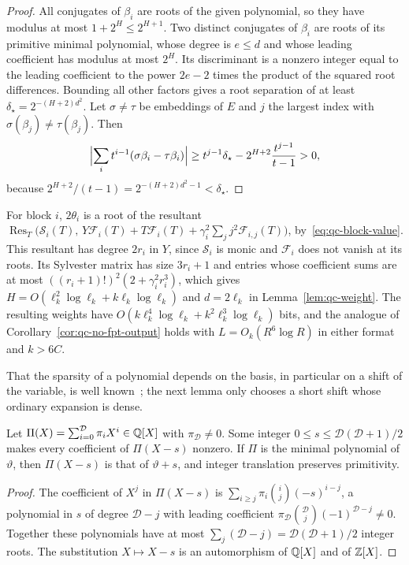 \begin{proof}
All conjugates of $\beta_i$ are roots of the given polynomial, so they have
modulus at most $1+2^H\le2^{H+1}$. Two distinct conjugates of $\beta_i$ are
roots of its primitive minimal polynomial, whose degree is $e\le d$ and whose
leading coefficient has modulus at most $2^H$. Its discriminant is a nonzero
integer equal to the leading coefficient to the power $2e-2$ times the
product of the squared root differences. Bounding all other factors gives a
root separation of at least $\delta_\star=2^{-(H+2)d^2}$. Let $\sigma\ne\tau$
be embeddings of $E$ and $j$ the largest index with
$\sigma(\beta_j)\ne\tau(\beta_j)$. Then
\[
\Bigl\lvert\sum_it^{i-1}(\sigma\beta_i-\tau\beta_i)\Bigr\rvert
\ge t^{j-1}\delta_\star-2^{H+2}\frac{t^{j-1}}{t-1}>0,
\]
because $2^{H+2}/(t-1)=2^{-(H+2)d^2-1}<\delta_\star$.
\end{proof}

For block $i$, $2\theta_i$ is a root of the resultant
$\operatorname{Res}_T\bigl(\mathcal S_i(T),\,Y\mathcal F_i(T)+T\mathcal F_i(T)
+\gamma_i^2\sum_jj^2\mathcal F_{i,j}(T)\bigr)$, by~\eqref{eq:qc-block-value}.
This resultant has degree $2r_i$ in $Y$, since $\mathcal S_i$ is monic and
$\mathcal F_i$ does not vanish at its roots. Its Sylvester matrix has size
$3r_i+1$ and entries whose coefficient sums are at most
$((r_i+1)!)^2(2+\gamma_i^2r_i^3)$, which gives
$H=O(\ell_k^2\log\ell_k+k\ell_k\log\ell_k)$ and $d=2\ell_k$ in
Lemma~\ref{lem:qc-weight}. The resulting weights have
$O(k\ell_k^4\log\ell_k+k^2\ell_k^3\log\ell_k)$ bits, and the analogue of
Corollary~\ref{cor:qc-no-fpt-output} holds with $L=O_k(R^6\log R)$ in either
format and $k>6C$.

That the sparsity of a polynomial depends on the basis, in particular on a
shift of the variable, is well known~\cite{GiesbrechtRoche2010}; the next
lemma only chooses a short shift whose ordinary expansion is dense.

\begin{lemma}
\label{lem:qc-translate}
Let $\Pi(X)=\sum_{i=0}^{\mathcal D}\pi_iX^i\in\mathbb Q[X]$ with
$\pi_{\mathcal D}\ne0$. Some integer $0\le s\le\mathcal D(\mathcal D+1)/2$
makes every coefficient of $\Pi(X-s)$ nonzero. If $\Pi$ is the minimal
polynomial of $\vartheta$, then $\Pi(X-s)$ is that of $\vartheta+s$, and
integer translation preserves primitivity.
\end{lemma}

\begin{proof}
The coefficient of $X^j$ in $\Pi(X-s)$ is
$\sum_{i\ge j}\pi_i\binom ij(-s)^{i-j}$, a polynomial in $s$ of degree
$\mathcal D-j$ with leading coefficient $\pi_{\mathcal D}\binom{\mathcal
D}j(-1)^{\mathcal D-j}\ne0$. Together these polynomials have at most
$\sum_j(\mathcal D-j)=\mathcal D(\mathcal D+1)/2$ integer roots. The
substitution $X\mapsto X-s$ is an automorphism of $\mathbb Q[X]$ and of $\mathbb Z[X]$.
\end{proof}

